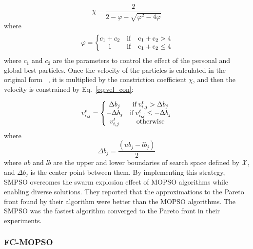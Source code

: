 \begin{equation} \label{eq:con_coe}
\chi = \frac{2}{2 -\varphi - \sqrt{\varphi^2 -4\varphi}}
\end{equation}
\noindent where
\begin{equation}
\varphi = \left\{ \begin{matrix}
    c_1 + c_2 & \rm{if} \quad c_1 +c_2 > 4 \\ 
    1 & \rm{if} \quad c_1 +c_2 \leq 4
\end{matrix} \right.
\end{equation}
\noindent where $c_1$ and $c_2$ are the parameters to control the effect of the personal and global best particles.
Once the velocity of the particles is calculated in the original form ~\cite{nebro2009smpso}, it is multiplied by the constriction coefficient $\chi$, and then the velocity is constrained by Eq.~\ref{eq:vel_con}: %

\begin{equation} \label{eq:vel_con}
v_{i, j}^t = \left\{ \begin{matrix}
    \Delta b_j & {\rm if} \, v_{i,j}^t > \Delta b_j\\
    -\Delta b_j & {\rm if} \, v_{i,j}^t \leq -\Delta b_j\\
    v_{i,j}^t & {\rm otherwise}
\end{matrix} \right.
\end{equation}
\noindent where
\begin{equation}
    \Delta b_j = \frac{(ub_j -lb_j)}{2}
\end{equation}
\noindent where $ub$ and $lb$ are the upper and lower boundaries of search space defined by $\mathcal{X}$, and $\Delta b_j$ is the center point between them.
By implementing this strategy, SMPSO overcomes the swarm explosion effect of MOPSO algorithms while enabling diverse solutions. 
They reported that the approximations to the Pareto front found by their algorithm were better than the MOPSO algorithms. The SMPSO was the fastest algorithm converged to the Pareto front in their experiments.

\subsubsection{FC-MOPSO}

